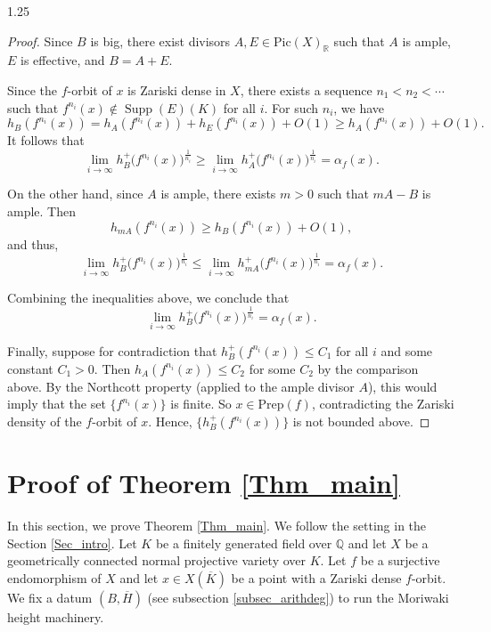 \documentclass[12pt]{amsart}
\newcommand{\mr}[1]{\mathrm{#1}}
\begin{document}
\begin{spacing}{1.25}
\begin{proof}
Since $B$ is big, there exist divisors $A, E \in \mathrm{Pic}(X)_{\mathbb{R}}$ such that $A$ is ample, $E$ is effective, and $B = A + E$.

Since the $f$-orbit of $x$ is Zariski dense in $X$, there exists a sequence $n_1 < n_2 < \cdots$ such that $f^{n_i}(x) \notin \operatorname{Supp}(E)(K)$ for all $i$. For such $n_i$, we have
\[
h_B(f^{n_i}(x)) = h_A(f^{n_i}(x)) + h_E(f^{n_i}(x)) + O(1) \geq h_A(f^{n_i}(x)) + O(1).
\]
It follows that
\[
\lim_{i \to \infty} h_B^+\big(f^{n_i}(x)\big)^{\frac{1}{n_i}} \geq \lim_{i \to \infty} h_A^+\big(f^{n_i}(x)\big)^{\frac{1}{n_i}} = \alpha_f(x).
\]

On the other hand, since $A$ is ample, there exists $m > 0$ such that $mA - B$ is ample. Then
\[
h_{mA}(f^{n_i}(x)) \geq h_B(f^{n_i}(x)) + O(1),
\]
and thus,
\[
\lim_{i \to \infty} h_B^+\big(f^{n_i}(x)\big)^{\frac{1}{n_i}} \leq \lim_{i \to \infty} h_{mA}^+\big(f^{n_i}(x)\big)^{\frac{1}{n_i}} = \alpha_f(x).
\]

Combining the inequalities above, we conclude that
\[
\lim_{i \to \infty} h_B^+\big(f^{n_i}(x)\big)^{\frac{1}{n_i}} = \alpha_f(x).
\]

Finally, suppose for contradiction that $h_B^+(f^{n_i}(x)) \leq C_1$ for all $i$ and some constant $C_1 > 0$. Then $h_A(f^{n_i}(x)) \leq C_2$ for some $C_2$ by the comparison above. By the Northcott property (applied to the ample divisor $A$), this would imply that the set $\{f^{n_i}(x)\}$ is finite. So $x\in \mr{Prep}(f)$, contradicting the Zariski density of the $f$-orbit of $x$. Hence, $\{h_B^+(f^{n_i}(x))\}$ is not bounded above.
\end{proof}










\section{Proof of Theorem \ref{Thm_main}}\label{Sec_proof}

In this section, we prove Theorem \ref{Thm_main}. We follow the setting in the Section \ref{Sec_intro}. Let $K$ be a finitely generated field over $\mathbb{Q}$ and let $X$ be a geometrically connected normal projective variety over $K$. Let $f$ be a surjective endomorphism of $X$ and let $x\in X(\overline{K})$ be a point with a Zariski dense $f$-orbit. We fix a datum $(B,\overline{H})$ (see subsection \ref{subsec_arithdeg}) to run the Moriwaki height machinery.


\end{spacing}
\end{document}
